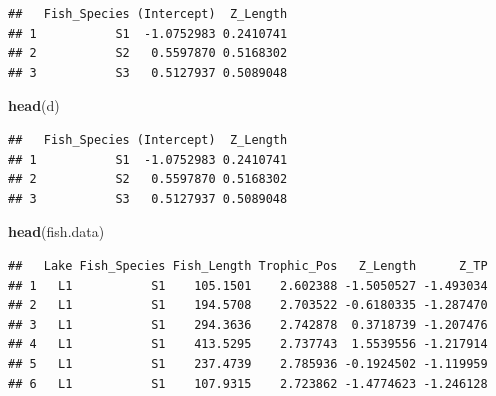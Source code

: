 \documentclass[
]{article}
\newenvironment{Shaded}{\begin{snugshade}}{\end{snugshade}}
\newcommand{\FunctionTok}[1]{\textcolor[rgb]{0.13,0.29,0.53}{\textbf{#1}}}
\newcommand{\NormalTok}[1]{#1}
\newcommand{\OtherTok}[1]{\textcolor[rgb]{0.56,0.35,0.01}{#1}}
\newcommand{\SpecialCharTok}[1]{\textcolor[rgb]{0.81,0.36,0.00}{\textbf{#1}}}
\newcommand{\StringTok}[1]{\textcolor[rgb]{0.31,0.60,0.02}{#1}}
\begin{document}
\begin{Shaded}
\end{Shaded}

\begin{verbatim}
##   Fish_Species (Intercept)  Z_Length
## 1           S1  -1.0752983 0.2410741
## 2           S2   0.5597870 0.5168302
## 3           S3   0.5127937 0.5089048
\end{verbatim}

\begin{Shaded}
\begin{Highlighting}[]
\FunctionTok{head}\NormalTok{(d)}
\end{Highlighting}
\end{Shaded}

\begin{verbatim}
##   Fish_Species (Intercept)  Z_Length
## 1           S1  -1.0752983 0.2410741
## 2           S2   0.5597870 0.5168302
## 3           S3   0.5127937 0.5089048
\end{verbatim}

\begin{Shaded}
\begin{Highlighting}[]
\FunctionTok{head}\NormalTok{(fish.data)}
\end{Highlighting}
\end{Shaded}

\begin{verbatim}
##   Lake Fish_Species Fish_Length Trophic_Pos   Z_Length      Z_TP
## 1   L1           S1    105.1501    2.602388 -1.5050527 -1.493034
## 2   L1           S1    194.5708    2.703522 -0.6180335 -1.287470
## 3   L1           S1    294.3636    2.742878  0.3718739 -1.207476
## 4   L1           S1    413.5295    2.737743  1.5539556 -1.217914
## 5   L1           S1    237.4739    2.785936 -0.1924502 -1.119959
## 6   L1           S1    107.9315    2.723862 -1.4774623 -1.246128
\end{verbatim}
\end{document}
